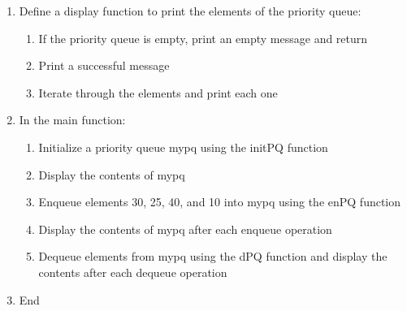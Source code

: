 \documentclass{article}
\begin{document}
\begin{enumerate}
\begin{enumerate}
    \end{enumerate}
  \item Define a display function to print the elements of the priority queue:
    \begin{enumerate}
      \item If the priority queue is empty, print an empty message and return
      \item Print a successful message
      \item Iterate through the elements and print each one
    \end{enumerate}
  \item In the main function:
    \begin{enumerate}
      \item Initialize a priority queue mypq using the initPQ function
      \item Display the contents of mypq
      \item Enqueue elements 30, 25, 40, and 10 into mypq using the enPQ function
      \item Display the contents of mypq after each enqueue operation
      \item Dequeue elements from mypq using the dPQ function and display the contents after each dequeue operation
    \end{enumerate}
  \item End
\end{enumerate}
\end{document}
